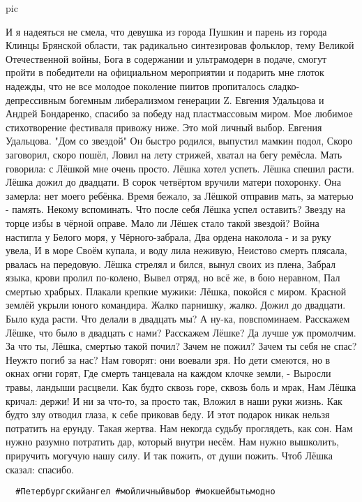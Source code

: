   pic 
\fi


И я надеяться не смела, что девушка из города Пушкин и парень из города Клинцы Брянской области, так радикально синтезировав фольклор, тему Великой Отечественной войны, Бога в содержании и ультрамодерн в подаче, смогут пройти в победители на официальном мероприятии и подарить мне глоток надежды, что не все молодое поколение пиитов пропиталось сладко-депрессивным богемным либерализмом генерации Z. 
Евгения Удальцова и Андрей Бондаренко, спасибо за победу над пластмассовым миром. 
Мое любимое стихотворение фестиваля привожу ниже. Это мой личный выбор.
Евгения Удальцова. "Дом со звездой"
Он быстро родился, выпустил мамкин подол, 
Скоро заговорил, скоро пошёл, 
Ловил на лету стрижей, хватал на бегу ремёсла. 
Мать говорила: с Лёшкой мне очень просто. 
Лёшка хотел успеть. Лёшка спешил расти. 
Лёшка дожил до двадцати. 
В сорок четвёртом вручили матери похоронку. 
Она замерла: нет моего ребёнка. 
Время бежало, за Лёшкой отправив мать, 
за матерью - память. Некому вспоминать. 
Что после себя Лёшка успел оставить? 
Звезду на торце избы в чёрной оправе. 
Мало ли Лёшек стало такой звездой? 
Война настигла у Белого моря, у Чёрного-забрала, 
Два ордена наколола - и за руку увела, 
И в море Своём купала, и воду лила неживую, 
Неистово смерть плясала, рвалась на передовую. 
Лёшка стрелял и бился, вынул своих из плена, 
Забрал языка, крови пролил по-колено, 
Вывел отряд, но всё же, в бою неравном, 
Пал смертью храбрых. 
Плакали крепкие мужики: Лёшка, покойся с миром. 
Красной землёй укрыли юного командира. 
Жалко парнишку, жалко. 
Дожил до двадцати. 
Было куда расти. 
Что делали в двадцать мы? А ну-ка, повспоминаем. 
Расскажем Лёшке, что было в двадцать с нами? 
Расскажем Лёшке? Да лучше уж промолчим. 
За что ты, Лёшка, смертью такой почил? 
Зачем не пожил? Зачем ты себя не спас? 
Неужто погиб за нас? 
Нам говорят: они воевали зря. 
Но дети смеются, но в окнах огни горят, 
Где смерть танцевала на каждом клочке земли, - 
Выросли травы, ландыши расцвели. 
Как будто сквозь горе, сквозь боль и мрак, 
Нам Лёшка кричал: держи! 
И ни за что-то, за просто так, 
Вложил в наши руки жизнь. 
Как будто злу отводил глаза, к себе приковав беду. 
И этот подарок никак нельзя потратить на ерунду. 
Такая жертва. Нам некогда судьбу проглядеть, как сон. 
Нам нужно разумно потратить дар, который внутри несём. 
Нам нужно вышколить, приручить могучую нашу силу. 
И так пожить, от души пожить. 
Чтоб Лёшка сказал: спасибо.

\begin{verbatim}
  #Петербургскийангел #мойличныйвыбор #мокшейбытьмодно
\end{verbatim}
